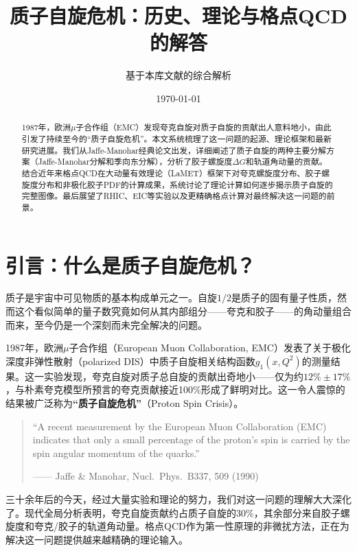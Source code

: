 \documentclass[12pt,a4paper]{ctexart}
\title{\heiti 质子自旋危机：历史、理论与格点QCD的解答}
\author{基于本库文献的综合解析}
\date{\today}
\theoremstyle{definition}
\begin{document}
\maketitle

\begin{abstract}
\noindent
1987年，欧洲$\mu$子合作组（EMC）发现夸克自旋对质子自旋的贡献出人意料地小，由此引发了持续至今的``质子自旋危机''。本文系统梳理了这一问题的起源、理论框架和最新研究进展。我们从Jaffe-Manohar经典论文出发，详细阐述了质子自旋的两种主要分解方案（Jaffe-Manohar分解和季向东分解），分析了胶子螺旋度$\Delta G$和轨道角动量的贡献。结合近年来格点QCD在大动量有效理论（LaMET）框架下对夸克螺旋度分布、胶子螺旋度分布和非极化胶子PDF的计算成果，系统讨论了理论计算如何逐步揭示质子自旋的完整图像。最后展望了RHIC、EIC等实验以及更精确格点计算对最终解决这一问题的前景。
\end{abstract}

\tableofcontents
\newpage

\section{引言：什么是质子自旋危机？}

质子是宇宙中可见物质的基本构成单元之一。自旋$1/2$是质子的固有量子性质，然而这个看似简单的量子数究竟如何从其内部组分——夸克和胶子——的角动量组合而来，至今仍是一个深刻而未完全解决的问题。

1987年，欧洲$\mu$子合作组（European Muon Collaboration, EMC）发表了关于极化深度非弹性散射（polarized DIS）中质子自旋相关结构函数$g_1(x,Q^2)$的测量结果\cite{EMC}。这一实验发现，夸克自旋对质子总自旋的贡献出奇地小——仅为约$12\% \pm 17\%$，与朴素夸克模型所预言的夸克贡献接近100\%形成了鲜明对比。这一令人震惊的结果被广泛称为\textbf{``质子自旋危机''}（Proton Spin Crisis）。

\begin{quote}
\small
``A recent measurement by the European Muon Collaboration (EMC) indicates that only a small percentage of the proton's spin is carried by the spin angular momentum of the quarks.''
\begin{flushright}
—— Jaffe \& Manohar, Nucl.\ Phys.\ B337, 509 (1990) \cite{JaffeManohar1990}
\end{flushright}
\end{quote}

三十余年后的今天，经过大量实验和理论的努力，我们对这一问题的理解大大深化了。现代全局分析表明，夸克自旋贡献约占质子自旋的30\%\cite{DSSV14,NNPDFpol11,JAM17}，其余部分来自胶子螺旋度和夸克/胶子的轨道角动量。格点QCD作为第一性原理的非微扰方法，正在为解决这一问题提供越来越精确的理论输入\cite{Egerer2022,LP3helicity,Lin2025gluon}。
\end{document}
